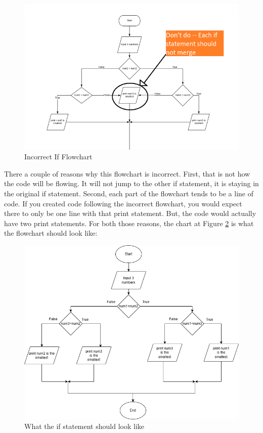\begin{figure}[h]
    \centering
    \includegraphics[width=12cm]{images/incorrectifflow.PNG}
    \caption{Incorrect If Flowchart}
    \label{fig:bad_ifflow}
\end{figure}
There a couple of reasons why this flowchart is incorrect. First, that
is not how the code will be flowing. It will not jump to the other if
statement, it is staying in the original if statement. Second, each 
part of the flowchart tends to be a line of code. If you created code following the incorrect flowchart, you would expect there to only be 
one line with that print statement. But, the code would actually have
two print statements. For both those reasons, the chart at Figure \ref{fig:correctifflow} is what the flowchart should look like:

\begin{figure}[h]
    \centering
    \includegraphics[width=12cm]{images/correctedif.png}
    \caption{What the if statement should look like}
    \label{fig:correctifflow}
\end{figure}

